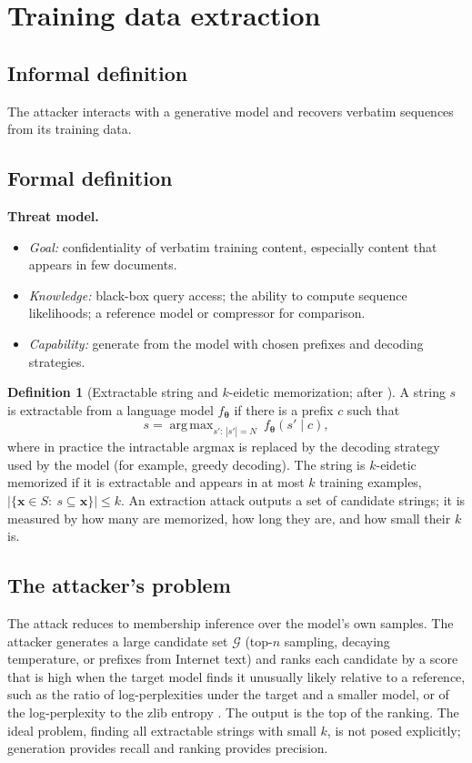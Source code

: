 \documentclass[10pt,a4paper]{extarticle}
\theoremstyle{definition}
\newtheorem{definition}{Definition}[section]
\newcommand{\x}{\mathbf{x}}
\newcommand{\btheta}{\boldsymbol{\theta}}
\DeclareMathOperator*{\argmax}{arg\,max}
\newcommand{\threatmodel}[3]{%
\par\noindent\textbf{Threat model.}
\begin{itemize}[leftmargin=1.5em]
  \item \emph{Goal:} #1
  \item \emph{Knowledge:} #2
  \item \emph{Capability:} #3
\end{itemize}\par}
\begin{document}
\section{Training data extraction}\label{sec:extraction}

\subsection{Informal definition}

The attacker interacts with a generative model and recovers verbatim sequences from its training data.

\subsection{Formal definition}

\threatmodel{confidentiality of verbatim training content, especially content that appears in few documents.}{black-box query access; the ability to compute sequence likelihoods; a reference model or compressor for comparison.}{generate from the model with chosen prefixes and decoding strategies.}

\begin{definition}[Extractable string and $k$-eidetic memorization; after \citealp{carlini2021extracting}]\label{def:extraction}
A string $s$ is extractable from a language model $f_{\btheta}$ if there is a prefix $c$ such that
\[
s=\argmax_{s':\,|s'|=N}\ f_{\btheta}(s'\mid c),
\]
where in practice the intractable argmax is replaced by the decoding strategy used by the model (for example, greedy decoding). The string is $k$-eidetic memorized if it is extractable and appears in at most $k$ training examples, $|\{\x\in S:\ s\subseteq\x\}|\le k$. An extraction attack outputs a set of candidate strings; it is measured by how many are memorized, how long they are, and how small their $k$ is.
\end{definition}

\subsection{The attacker's problem}

The attack reduces to membership inference over the model's own samples. The attacker generates a large candidate set $\mathcal{G}$ (top-$n$ sampling, decaying temperature, or prefixes from Internet text) and ranks each candidate by a score that is high when the target model finds it unusually likely relative to a reference, such as the ratio of log-perplexities under the target and a smaller model, or of the log-perplexity to the zlib entropy \citep{carlini2021extracting}. The output is the top of the ranking. The ideal problem, finding all extractable strings with small $k$, is not posed explicitly; generation provides recall and ranking provides precision.
\end{document}
